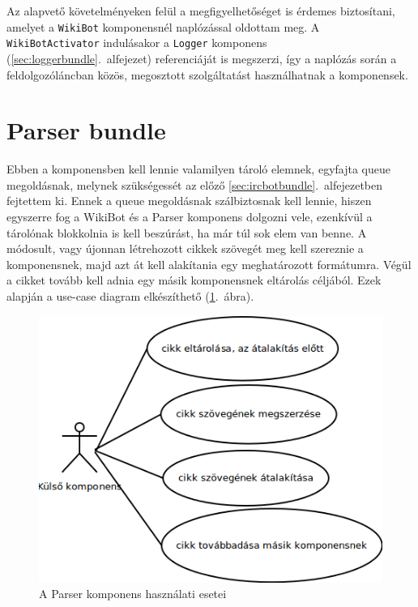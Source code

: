 Az alapvető követelményeken felül a megfigyelhetőséget is érdemes biztosítani, amelyet a \texttt{WikiBot} komponensnél naplózással oldottam meg. A \texttt{WikiBotActivator} indulásakor a \texttt{Logger} komponens (\ref{sec:loggerbundle}.~alfejezet) referenciáját is megszerzi, így a naplózás során a feldolgozóláncban közös, megosztott szolgáltatást használhatnak a komponensek.


\section{Parser bundle}
\label{sec:parserbundle}

Ebben a komponensben kell lennie valamilyen tároló elemnek, egyfajta queue megoldásnak, melynek szükségessét az előző \ref{sec:ircbotbundle}.~alfejezetben fejtettem ki. Ennek a queue megoldásnak szálbiztosnak kell lennie, hiszen egyszerre fog a WikiBot és a Parser komponens dolgozni vele, ezenkívül a tárolónak blokkolnia is kell beszúrást, ha már túl sok elem van benne. A módosult, vagy újonnan létrehozott cikkek szövegét meg kell szereznie a komponensnek, majd azt át kell alakítania egy meghatározott formátumra. Végül a cikket tovább kell adnia egy másik komponensnek eltárolás céljából. Ezek alapján a use-case diagram elkészíthető (\ref{fig:usecase_parser}.~ábra).

\begin{figure}[htp]
\centering
\includegraphics[scale=0.5]{img/usecase_parser}
\caption{A Parser komponens használati esetei}
\label{fig:usecase_parser}
\end{figure}

